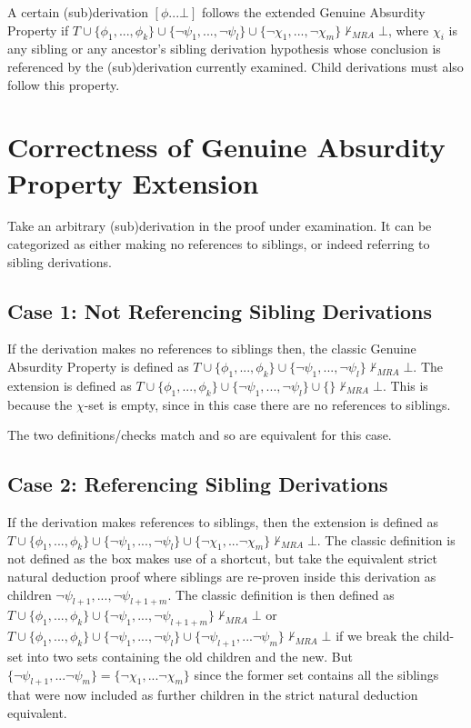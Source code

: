 \documentclass[11pt,twoside,a4paper]{report}
\begin{document}
A certain (sub)derivation $[\phi ... \bot]$ follows the extended Genuine Absurdity Property if $T\cup\{\phi_1, ..., \phi_k\}\cup\{\neg\psi_1, ..., \neg\psi_l\}\cup\{\neg\chi_1, ..., \neg\chi_m\}\nvdash_{MRA}\bot$, where $\chi_i$ is any sibling or any ancestor's sibling derivation hypothesis whose conclusion is referenced by the (sub)derivation currently examined. Child derivations must also follow this property.

\section{Correctness of Genuine Absurdity Property Extension}
Take an arbitrary (sub)derivation in the proof under examination. It can be categorized as either making no references to siblings, or indeed referring to sibling derivations.

\subsection{Case 1: Not Referencing Sibling Derivations}
If the derivation makes no references to siblings then, the classic Genuine Absurdity Property is defined as $T\cup\{\phi_1, ..., \phi_k\}\cup\{\neg\psi_1, ..., \neg\psi_l\}\nvdash_{MRA}\bot$. The extension is defined as $T\cup\{\phi_1, ..., \phi_k\}\cup\{\neg\psi_1, ..., \neg\psi_l\}\cup\{\}\nvdash_{MRA}\bot$. This is because the $\chi$-set is empty, since in this case there are no references to siblings.

The two definitions/checks match and so are equivalent for this case.

\subsection{Case 2: Referencing Sibling Derivations}
If the derivation makes references to siblings, then the extension is defined as $T\cup\{\phi_1, ..., \phi_k\}\cup\{\neg\psi_1, ..., \neg\psi_l\}\cup\{\neg\chi_1, ... \neg\chi_m\}\nvdash_{MRA}\bot$. The classic definition is not defined as the box makes use of a shortcut, but take the equivalent strict natural deduction proof where siblings are re-proven inside this derivation as children $\neg\psi_{l+1}, ..., \neg\psi_{l+1+m}$. The classic definition is then defined as $T\cup\{\phi_1, ..., \phi_k\}\cup\{\neg\psi_1, ..., \neg\psi_{l+1+m}\}\nvdash_{MRA}\bot$ or $T\cup\{\phi_1, ..., \phi_k\}\cup\{\neg\psi_1, ..., \neg\psi_l\}\cup\{\neg\psi_{l+1}, ... \neg\psi_m\}\nvdash_{MRA}\bot$ if we break the child-set into two sets containing the old children and the new. But $\{\neg\psi_{l+1}, ... \neg\psi_m\} = \{\neg\chi_1, ... \neg\chi_m\}$ since the former set contains all the siblings that were now included as further children in the strict natural deduction equivalent.
\end{document}
